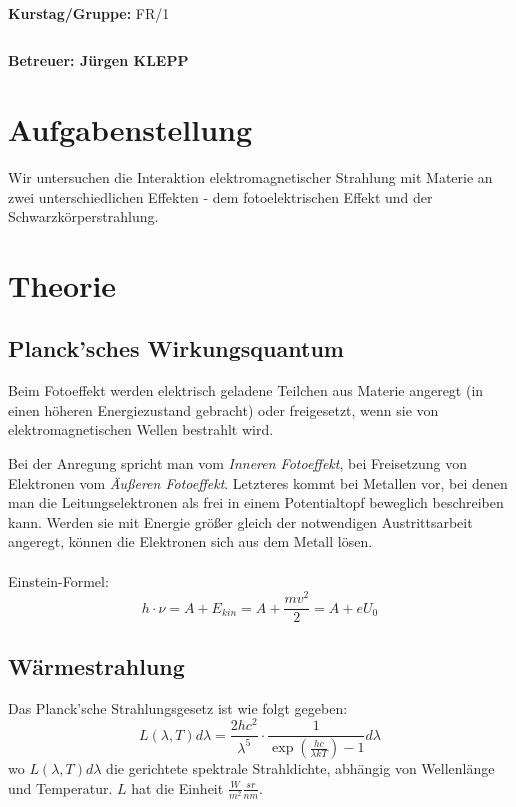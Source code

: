 \documentclass[12pt,a4paper,twopage]{article}
\begin{document}
\begin{verbatim}


\end{verbatim}
			\begin{flushleft}
			\textbf{\Large{Kurstag/Gruppe:}} \Large{FR/1}
			\end{flushleft}

\begin{verbatim}

\end{verbatim}
			\begin{flushleft}
			\LARGE{\textbf{Betreuer:\Large{ Jürgen KLEPP }}}		
			\end{flushleft}
\newpage
			
\section{Aufgabenstellung}
Wir untersuchen die Interaktion elektromagnetischer Strahlung mit Materie an zwei unterschiedlichen Effekten - dem fotoelektrischen Effekt und der Schwarzkörperstrahlung.
\section{Theorie}
\subsection{Planck'sches Wirkungsquantum}
Beim Fotoeffekt werden elektrisch geladene Teilchen aus Materie angeregt (in einen höheren Energiezustand gebracht) oder freigesetzt, wenn sie von elektromagnetischen Wellen bestrahlt wird. 

Bei der Anregung spricht man vom \textit{Inneren Fotoeffekt}, bei Freisetzung von Elektronen vom \textit{Äußeren Fotoeffekt}. Letzteres kommt bei Metallen vor, bei denen man die Leitungselektronen als frei in einem Potentialtopf beweglich beschreiben kann. Werden sie mit Energie größer gleich der notwendigen Austrittsarbeit angeregt, können die Elektronen sich aus dem Metall lösen.\\
\\
Einstein-Formel:
$$h\cdot\nu=A+E_{kin}=A+\frac{mv^2}{2}=A+eU_0$$


\subsection{Wärmestrahlung}
Das Planck'sche Strahlungsgesetz ist wie folgt gegeben:
\begin{equation}
L(\lambda,T)d\lambda = \frac{2hc^2}{\lambda^5} \cdot \frac{1}{\exp\left(\frac{hc}{\lambda kT}\right) -1} d\lambda
\label{strahlungsgesetz}
\end{equation}
wo $L(\lambda,T)d\lambda$ die gerichtete spektrale Strahldichte, abhängig von Wellenlänge und Temperatur. $L$ hat die Einheit $\frac{W}{m^2}\frac{sr}{nm}$.\\
\\
\end{document}
